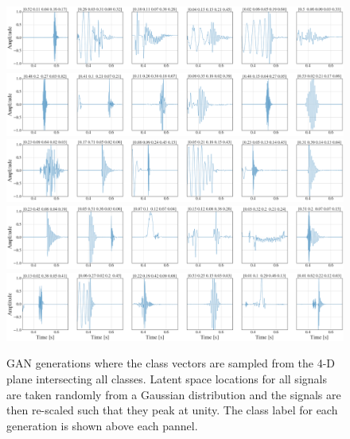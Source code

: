 \documentclass[12pt]{iopart}
\begin{document}
\begin{figure}
    \centering
    \includegraphics[width=\textwidth]{figures/generations/simplex_sample1.png}
    \includegraphics[width=\textwidth]{figures/generations/simplex_sample2.png}
    \includegraphics[width=\textwidth]{figures/generations/simplex_sample3.png}
    \includegraphics[width=\textwidth]{figures/generations/simplex_sample4.png}
    \includegraphics[width=\textwidth]{figures/generations/simplex_sample5.png}
    \caption{GAN generations where the class vectors are sampled from the 4-D
plane intersecting all classes. Latent space locations for all signals are taken randomly from a Gaussian distribution and the signals are then re-scaled such that they peak at unity. The class label for each generation is shown above each pannel.}
    \label{fig:simplexd_samples}
\end{figure}
\end{document}
